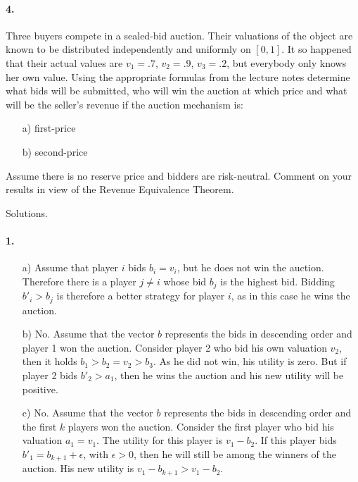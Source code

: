 \documentclass[a4paper,notitlepage,12pt]{article}
\begin{document}
\paragraph{4. } 

Three buyers compete in a sealed-bid auction. Their valuations of the object are known to be distributed independently and uniformly on $[0,1]$. It so happened that their actual values are $v_1 = .7$, $v_2 = .9$, $v_3 = .2$, but everybody only knows her own value. Using the appropriate formulas from the lecture notes determine what bids will be submitted, who will win the auction at which price and what will be the seller's revenue if the auction mechanism is:
\begin{enumerate}
\item[a)] first-price
\item[b)] second-price
\end{enumerate}
Assume there is no reserve price and bidders are risk-neutral. Comment on your results in view of the Revenue Equivalence Theorem.


\clearpage
Solutions.
\paragraph{1.}
\begin{enumerate}
\item[a)]
Assume that player $i$ bids $b_i = v_i$, but he does not win the auction. Therefore there is a player $j \neq i$ whose bid $b_j$ is the highest bid. Bidding $b'_i > b_j$ is therefore a better strategy for player $i$, as in this case he wins the auction.
\item[b)]
No. Assume that the vector $b$ represents the bids in descending order and player 1 won the auction. Consider player 2 who bid his own valuation $v_2$, then it holds $b_1 > b_2 = v_2 > b_3$. As he did not win, his utility is zero. But if player 2 bids $b'_2 > a_1$, then he wins the auction and his new utility will be positive.
\item[c)]
No. Assume that the vector $b$ represents the bids in descending order and the first $k$ players won the auction. Consider the first player who bid his valuation $a_1 = v_1$. The utility for this player is $v_1-b_2$. If this player bids $b'_1 = b_{k+1} + \epsilon$, with $\epsilon > 0$, then he will still be among the winners of the auction. His new utility is $v_1-b_{k+1} > v_1-b_2$. 
\end{enumerate}
\end{document}
